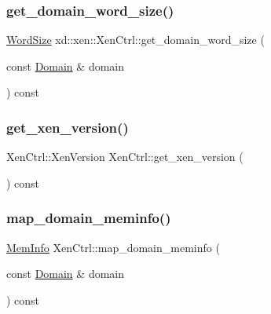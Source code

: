 \subsubsection{\texorpdfstring{get\+\_\+domain\+\_\+word\+\_\+size()}{get\_domain\_word\_size()}}
{\footnotesize\ttfamily \mbox{\hyperlink{namespacexd_1_1xen_ab0ad6c1b122ad0b67c749ee5bae3cc1c}{Word\+Size}} xd\+::xen\+::\+Xen\+Ctrl\+::get\+\_\+domain\+\_\+word\+\_\+size (\begin{DoxyParamCaption}\item[{const \mbox{\hyperlink{classxd_1_1xen_1_1_domain}{Domain}} \&}]{domain }\end{DoxyParamCaption}) const}

\mbox{\label{classxd_1_1xen_1_1_xen_ctrl_a7295e9559d14173e54de41a642278fae}} 
\subsubsection{\texorpdfstring{get\+\_\+xen\+\_\+version()}{get\_xen\_version()}}
{\footnotesize\ttfamily Xen\+Ctrl\+::\+Xen\+Version Xen\+Ctrl\+::get\+\_\+xen\+\_\+version (\begin{DoxyParamCaption}{ }\end{DoxyParamCaption}) const}

\mbox{\label{classxd_1_1xen_1_1_xen_ctrl_ab79568724d8e81ead5969fb14f458997}} 
\subsubsection{\texorpdfstring{map\+\_\+domain\+\_\+meminfo()}{map\_domain\_meminfo()}}
{\footnotesize\ttfamily \mbox{\hyperlink{namespacexd_1_1xen_a34ff770013f1c25915f83aac337f2334}{Mem\+Info}} Xen\+Ctrl\+::map\+\_\+domain\+\_\+meminfo (\begin{DoxyParamCaption}\item[{const \mbox{\hyperlink{classxd_1_1xen_1_1_domain}{Domain}} \&}]{domain }\end{DoxyParamCaption}) const}

